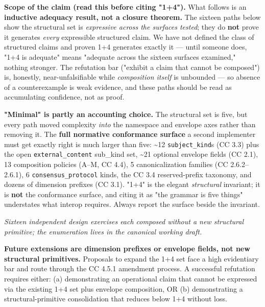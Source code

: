 \documentclass[11pt]{article}
\begin{document}
\textbf{Scope of the claim (read this before citing "1+4").} What follows is an \textbf{inductive adequacy result, not a closure theorem.} The sixteen paths below show the structural set is \textit{expressive across the surfaces tested}; they do \textbf{not} prove it generates \textit{every} expressible structured claim. We have not defined the class of structured claims and proven 1+4 generates exactly it — until someone does, "1+4 is adequate" means "adequate across the sixteen surfaces examined," nothing stronger. The refutation bar ("exhibit a claim that cannot be composed") is, honestly, near-unfalsifiable while \textit{composition itself} is unbounded — so absence of a counterexample is weak evidence, and these paths should be read as accumulating confidence, not as proof.


\textbf{"Minimal" is partly an accounting choice.} The structural set is five, but every path moved complexity \textit{into} the namespace and envelope axes rather than removing it. The \textbf{full normative conformance surface} a second implementer must get exactly right is much larger than five: \textasciitilde{}12 \texttt{subject\_kind}s (CC 3.3) plus the open \texttt{external\_content} sub\_kind set, \textasciitilde{}21 optional envelope fields (CC 2.1), 13 composition policies (A–M, CC 4.4), 5 canonicalization families (CC 2.6.2–2.6.1), 6 \texttt{consensus\_protocol} kinds, the CC 3.4 reserved-prefix taxonomy, and dozens of dimension prefixes (CC 3.1). "1+4" is the elegant \textit{structural} invariant; it is \textbf{not} the conformance surface, and citing it as "the grammar is five things" understates what interop requires. Always report the surface beside the invariant.


\textit{Sixteen independent design exercises each composed without a new structural primitive; the enumeration lives in the canonical working draft.}


\textbf{Future extensions are dimension prefixes or envelope fields, not new structural primitives.} Proposals to expand the 1+4 set face a high evidentiary bar and route through the CC 4.5.1 amendment process. A successful refutation requires either: (a) demonstrating an operational claim that cannot be expressed via the existing 1+4 set plus envelope composition, OR (b) demonstrating a structural-primitive consolidation that reduces below 1+4 without loss.
\end{document}
